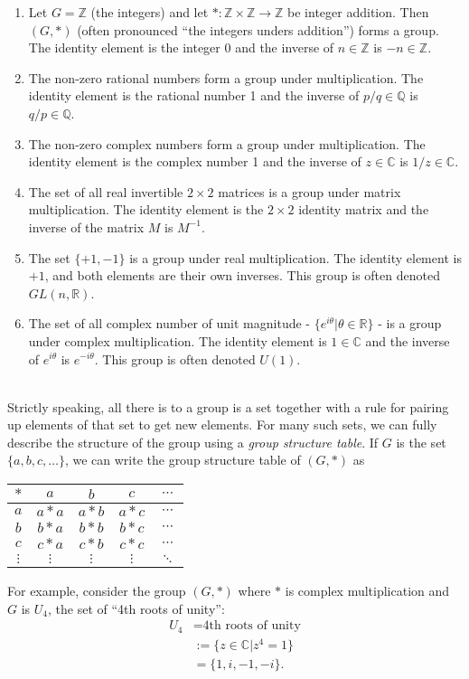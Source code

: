 \documentclass[12 pt]{article}
\newcommand{\R}{\mathbb{R}}
\newcommand{\Z}{\mathbb{Z}}
\newcommand{\C}{\mathbb{C}}
\newcommand{\Q}{\mathbb{Q}}
\numberwithin{equation}{section}
\begin{document}
\begin{enumerate}
\item Let $G = \Z$ (the integers) and let $ * : \Z \times \Z \rightarrow \Z$ be integer addition. Then $(G, *)$ (often pronounced ``the integers unders addition'') forms a group. The identity element is the integer 0 and the inverse of $n \in \Z$ is $-n \in \Z$.
\item The non-zero rational numbers form a group under multiplication. The identity element is the rational number 1 and the inverse of $p / q \in \Q$ is $q / p \in \Q$.
\item The non-zero complex numbers form a group under multiplication. The identity element is the complex number 1 and the inverse of $z \in \C$ is $1/z \in \C$.
\item The set of all real invertible $2 \times 2$ matrices is a group under matrix multiplication. The identity element is the $2 \times 2$ identity matrix and the inverse of the matrix $M$ is $M^{-1}$. 
\item The set $\{+1, -1\}$ is a group under real multiplication. The identity element is $+1$, and both elements are their own inverses. This group is often denoted $GL(n,\R)$.
\item The set of all complex number of unit magnitude - $\{e^{i \theta} | \theta \in \R \}$ - is a group under complex multiplication. The identity element is $1 \in \C$ and the inverse of $e^{i \theta}$ is $e^{- i \theta}$. This group is often denoted $U(1)$.
\end{enumerate}
\
\\
Strictly speaking, all there is to a group is a set together with a rule for pairing up elements of that set to get new elements. For many such sets, we can fully describe the structure of the group using a \textit{group structure table}. If $G$ is the set $\{a, b, c, \ldots \}$, we can write the group structure table of $(G, *)$ as \begin{center}
\begin{tabular}{c | c c c c}
$*$ & $a$ & $b$ & $c$ & $\cdots$ \\
\hline
$a$ & $a*a$ & $a*b$ & $a*c$ & $\cdots$ \\
$b$ & $b*a$ & $b*b$ & $b*c$ & $\cdots$ \\
$c$ & $c*a$ & $c*b$ & $c*c$ & $\cdots$ \\
$\vdots$ & $\vdots$ & $\vdots$ & $\vdots$ & $\ddots$
\end{tabular}
\end{center}
For example, consider the group $(G,*)$ where $*$ is complex multiplication and $G$ is $U_4$, the set of ``4th roots of unity'': \begin{align*}
U_4 & = \mbox{4th roots of unity} \\
\ & := \{ z \in \C | z^4 = 1 \} \\
\ & = \{1, i, -1, -i\}.
\end{align*}
\end{document}
